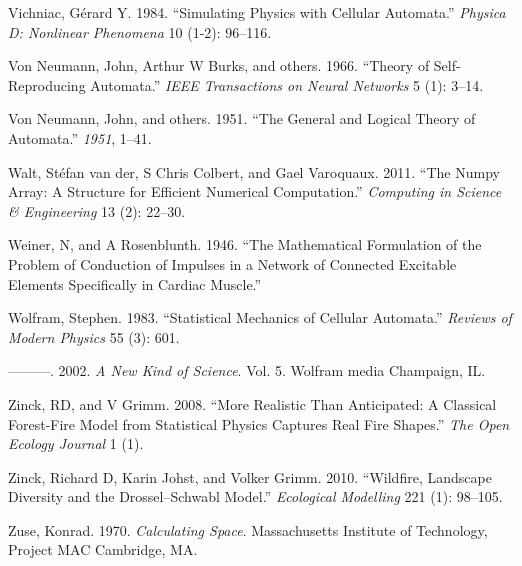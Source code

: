 \documentclass[
  openany]{book}
\newlength{\cslhangindent}
\newenvironment{cslreferences}%
  {\setlength{\parindent}{0pt}%
  \everypar{\setlength{\hangindent}{\cslhangindent}}\ignorespaces}%
  {\par}
\begin{document}
\begin{cslreferences}
\leavevmode\hypertarget{ref-vichniac1984simulating}{}%
Vichniac, Gérard Y. 1984. ``Simulating Physics with Cellular Automata.'' \emph{Physica D: Nonlinear Phenomena} 10 (1-2): 96--116.

\leavevmode\hypertarget{ref-von1966theory}{}%
Von Neumann, John, Arthur W Burks, and others. 1966. ``Theory of Self-Reproducing Automata.'' \emph{IEEE Transactions on Neural Networks} 5 (1): 3--14.

\leavevmode\hypertarget{ref-von1951general}{}%
Von Neumann, John, and others. 1951. ``The General and Logical Theory of Automata.'' \emph{1951}, 1--41.

\leavevmode\hypertarget{ref-walt2011numpy}{}%
Walt, Stéfan van der, S Chris Colbert, and Gael Varoquaux. 2011. ``The Numpy Array: A Structure for Efficient Numerical Computation.'' \emph{Computing in Science \& Engineering} 13 (2): 22--30.

\leavevmode\hypertarget{ref-weiner1946mathematical}{}%
Weiner, N, and A Rosenblunth. 1946. ``The Mathematical Formulation of the Problem of Conduction of Impulses in a Network of Connected Excitable Elements Specifically in Cardiac Muscle.''

\leavevmode\hypertarget{ref-wolfram1983statistical}{}%
Wolfram, Stephen. 1983. ``Statistical Mechanics of Cellular Automata.'' \emph{Reviews of Modern Physics} 55 (3): 601.

\leavevmode\hypertarget{ref-wolfram2002new}{}%
---------. 2002. \emph{A New Kind of Science}. Vol. 5. Wolfram media Champaign, IL.

\leavevmode\hypertarget{ref-zinck2008more}{}%
Zinck, RD, and V Grimm. 2008. ``More Realistic Than Anticipated: A Classical Forest-Fire Model from Statistical Physics Captures Real Fire Shapes.'' \emph{The Open Ecology Journal} 1 (1).

\leavevmode\hypertarget{ref-zinck2010wildfire}{}%
Zinck, Richard D, Karin Johst, and Volker Grimm. 2010. ``Wildfire, Landscape Diversity and the Drossel--Schwabl Model.'' \emph{Ecological Modelling} 221 (1): 98--105.

\leavevmode\hypertarget{ref-zuse1970calculating}{}%
Zuse, Konrad. 1970. \emph{Calculating Space}. Massachusetts Institute of Technology, Project MAC Cambridge, MA.
\end{cslreferences}
\end{document}
